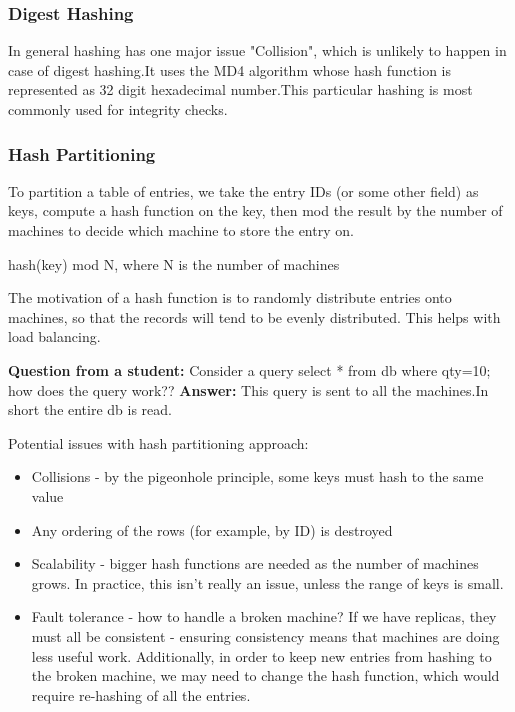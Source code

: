 \documentclass[twoside]{article}
\begin{document}
\subsubsection{Digest Hashing}
In general hashing has one major issue "Collision", which is unlikely to happen in case of digest hashing.It uses the MD4 algorithm whose hash function is represented as 32 digit hexadecimal number.This particular hashing is most commonly used for integrity checks.

\subsubsection{Hash Partitioning}
To partition a table of entries, we take the entry IDs (or some other field) as keys, compute a hash function on the key, then mod the result by the number of machines to decide which machine to store the entry on.


hash(key) mod N, where N is the number of machines

The motivation of a hash function is to randomly distribute entries onto machines, so that the records will tend to be evenly distributed. This helps with load balancing.

\textbf{Question from a student:}
Consider a query select * from db where qty=10; how does the query work??
\textbf{Answer:} This query is sent to all the machines.In short the entire db is read.

Potential issues with hash partitioning approach:
\begin{itemize}
\item Collisions - by the pigeonhole principle, some keys must hash to the same value
\item Any ordering of the rows (for example, by ID) is destroyed
\item Scalability - bigger hash functions are needed as the number of machines grows. In practice, this isn't really an issue, unless the range of keys is small.
\item Fault tolerance - how to handle a broken machine? If we have replicas, they must all be consistent - ensuring consistency means that machines are doing less useful work. Additionally, in order to keep new entries from hashing to the broken machine, we may need to change the hash function, which would require re-hashing of all the entries. 
\end{itemize}
\end{document}
